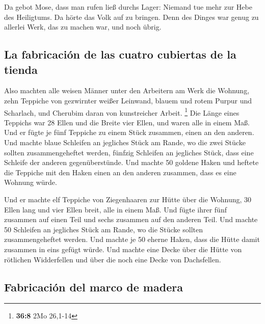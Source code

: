  Da gebot Mose, dass man rufen ließ durchs Lager: Niemand
tue mehr zur Hebe des Heiligtums. Da hörte das Volk auf zu bringen.
 Denn des Dinges war genug zu allerlei Werk, das zu machen
war, und noch übrig.

\hypertarget{la-fabricaciuxf3n-de-las-cuatro-cubiertas-de-la-tienda}{%
\subsection{La fabricación de las cuatro cubiertas de la
tienda}\label{la-fabricaciuxf3n-de-las-cuatro-cubiertas-de-la-tienda}}

 Also machten alle weisen Männer unter den Arbeitern am
Werk die Wohnung, zehn Teppiche von gezwirnter weißer Leinwand, blauem
und rotem Purpur und Scharlach, und Cherubim daran von kunstreicher
Arbeit. \footnote{\textbf{36:8} 2Mo 26,1-14}  Die Länge
eines Teppichs war 28 Ellen und die Breite vier Ellen, und waren alle in
einem Maß.  Und er fügte je fünf Teppiche zu einem Stück
zusammen, einen an den anderen.  Und machte blaue
Schleifen an jegliches Stück am Rande, wo die zwei Stücke sollten
zusammengeheftet werden,  fünfzig Schleifen an jegliches
Stück, dass eine Schleife der anderen gegenüberstünde. 
Und machte 50 goldene Haken und heftete die Teppiche mit den Haken einen
an den anderen zusammen, dass es eine Wohnung würde.

 Und er machte elf Teppiche von Ziegenhaaren zur Hütte
über die Wohnung,  30 Ellen lang und vier Ellen breit,
alle in einem Maß.  Und fügte ihrer fünf zusammen auf
einen Teil und sechs zusammen auf den anderen Teil.  Und
machte 50 Schleifen an jegliches Stück am Rande, wo die Stücke sollten
zusammengeheftet werden.  Und machte je 50 eherne Haken,
dass die Hütte damit zusammen in eins gefügt würde.  Und
machte eine Decke über die Hütte von rötlichen Widderfellen und über die
noch eine Decke von Dachsfellen.

\hypertarget{fabricaciuxf3n-del-marco-de-madera}{%
\subsection{Fabricación del marco de
madera}\label{fabricaciuxf3n-del-marco-de-madera}}

